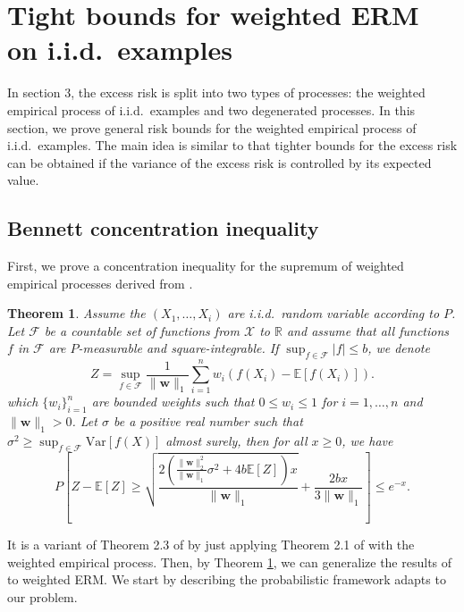 \documentclass[letterpaper]{article} %
\newtheorem{theorem}{Theorem}
\newcommand{\E}{\mathbb{E}}
\newcommand{\Pro}{P}
\newcommand{\Var}{\text{Var}}
\newcommand{\weight}{\mathbf{w}}
\newcommand{\normo}[1]{\|#1\|_1}
\begin{document}
\section{Tight bounds for weighted ERM on i.i.d.\ examples} %
\label{sub:weighted_risk_bounds}

In section 3, the excess risk is split into two types of processes: the weighted empirical process of i.i.d.\ examples and two degenerated processes.
In this section, we prove general risk bounds for the weighted empirical process of i.i.d.\ examples. 
The main idea is similar to \cite{Massart2006} that tighter bounds for the excess risk can be obtained if the variance of the excess risk is controlled by its expected value.

\subsection{Bennett concentration inequality} %
\label{subsub:bennett_type_inequality}


First, we prove a concentration inequality for the supremum of weighted empirical processes derived from \cite{Bousquet2002a}.

\begin{theorem}
    \label{th:weighted_bennett_inequality}
    Assume the $(X_1,\dots,X_i)$ are i.i.d.\ random variable according to $P$. Let $\mathcal F$ be a countable set of functions from $\mathcal X$ to $\mathbb R$ and assume that all functions $f$ in $\mathcal F$ are $P$-measurable and square-integrable. If $\sup_{f\in\mathcal F} |f| \le b$, we denote
    \[Z = \sup_{f\in \mathcal F} \frac{1}{\normo{\weight{}}}\sum_{i=1}^n w_i (f(X_i)-\E[f(X_i)]).\]
    which $\{w_i\}_{i=1}^n$ are bounded weights such that $0\le w_i\le 1$ for $i=1,\dots,n$ and $\normo{\weight{}}>0$.
    Let $\sigma$ be a positive real number such that $\sigma^2\ge \sup_{f\in\mathcal F} \Var[f(X)]$ almost surely, then for all $x\ge 0$, we have
    \begin{equation}
        \label{eq:weighted_bennett_inequality}
            \Pro\left[Z-\E[Z] \ge \sqrt{\frac{2(\frac{\|\weight{}\|_2^2}{\normo{\weight{}}}\sigma^2+4b\E[Z])x}{\normo{\weight{}}}} + \frac{2bx}{3\normo{\weight{}}}\right] \le e^{-x}.
    \end{equation}
\end{theorem}

It is a variant of Theorem 2.3 of \cite{Bousquet2002a} by just applying Theorem 2.1 of \cite{Bousquet2002a} with the weighted empirical process.
Then, by Theorem \ref{th:weighted_bennett_inequality}, we can generalize the results of \cite{Massart2006} to weighted ERM. We start by describing the probabilistic framework adapts to our problem.
\end{document}
